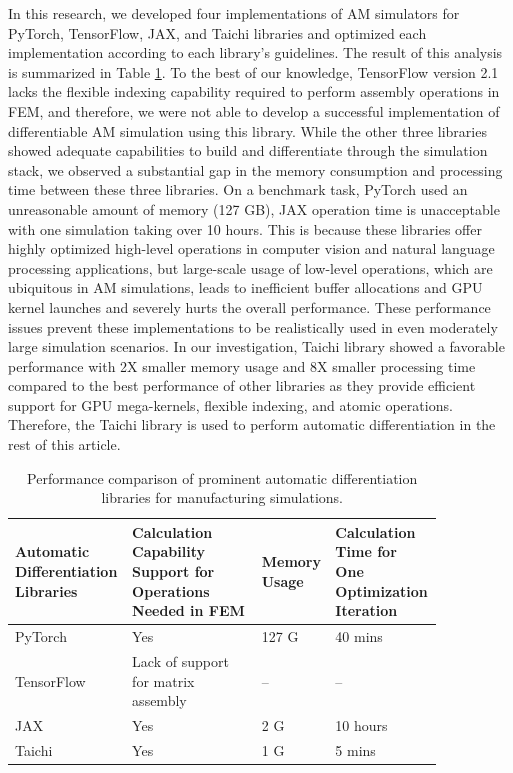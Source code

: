 \documentclass{article}
\begin{document}
In this research, we developed four implementations of AM simulators for PyTorch, TensorFlow, JAX, and Taichi libraries and optimized each implementation according to each library’s guidelines. The result of this analysis is summarized in Table \ref{tab:table2}. To the best of our knowledge, TensorFlow version 2.1 lacks the flexible indexing capability required to perform assembly operations in FEM, and therefore, we were not able to develop a successful implementation of differentiable AM simulation using this library. While the other three libraries showed adequate capabilities to build and differentiate through the simulation stack, we observed a substantial gap in the memory consumption and processing time between these three libraries. On a benchmark task, PyTorch used an unreasonable amount of memory (127 GB), JAX operation time is unacceptable with one simulation taking over 10 hours. This is because these libraries offer highly optimized high-level operations in computer vision and natural language processing applications, but large-scale usage of low-level operations, which are ubiquitous in AM simulations, leads to inefficient buffer allocations and GPU kernel launches and severely hurts the overall performance. These performance issues prevent these implementations to be realistically used in even moderately large simulation scenarios.  In our investigation, Taichi library showed a favorable performance with 2X smaller memory usage and 8X smaller processing time compared to the best performance of other libraries as they provide efficient support for GPU mega-kernels, flexible indexing, and atomic operations. Therefore, the Taichi library is used to perform automatic differentiation in the rest of this article.

\begin{table}
	\caption{Performance comparison of prominent automatic differentiation libraries for manufacturing simulations.}
	\centering
	\begin{tabular}{p{0.2\linewidth}|p{0.3\linewidth}|p{0.1\linewidth}|p{0.25\linewidth}}
		\toprule
		Automatic Differentiation Libraries     & Calculation Capability Support for Operations Needed in FEM     & Memory Usage   &   Calculation Time for One Optimization Iteration \\
		\midrule
		PyTorch     & Yes	          & 127 G    &    40 mins  \\
		TensorFlow     & Lack of support for matrix assembly  & --    &  -- \\
		JAX     & Yes	          & 2 G   &  10 hours \\
		Taichi &  Yes            &  1 G      & 5 mins   \\ 
		\bottomrule
	\end{tabular}
	\label{tab:table2}
\end{table}
\end{document}

